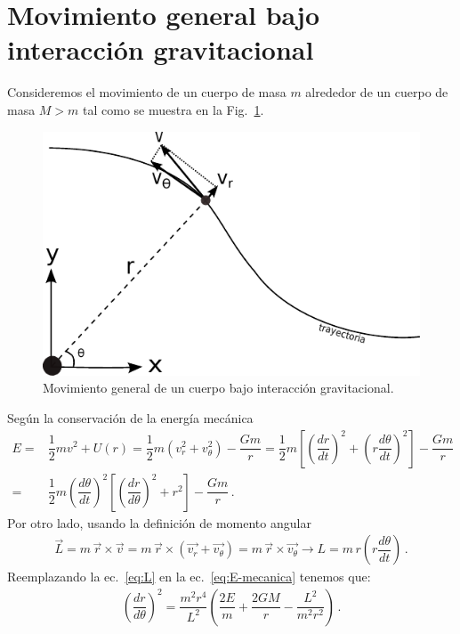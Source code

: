 \section{Movimiento general bajo interacción gravitacional}

Consideremos el movimiento de un cuerpo de masa $m$ alrededor de un cuerpo de masa $M>m$ tal como se muestra en la Fig.~\ref{fig:movimiento-general}.
\begin{figure}
\begin{center}
\includegraphics[scale=1]{gravitacion/g-movimiento-general}
\end{center}
\caption{Movimiento general de un cuerpo bajo interacción gravitacional.}
\label{fig:movimiento-general}
\end{figure}
Según la conservación de la energía mecánica
\begin{align}
\label{eq:E-mecanica}
E =& \dfrac{1}{2}mv^2 + U(r) = \dfrac{1}{2}m(v_r^2+v_\theta^2) -\dfrac{G m}{r} = \dfrac{1}{2}m\left[\left(\dfrac{dr}{dt}\right)^2+\left(r\dfrac{d\theta}{dt}\right)^2\right] -\dfrac{G m}{r} \nonumber \\
=& \dfrac{1}{2}m\left(\dfrac{d\theta}{dt}\right)^2 \left[\left(\dfrac{dr}{d\theta}\right)^2+r^2\right]-\dfrac{G m}{r}\,.
\end{align}
%
Por otro lado, usando la definición de momento angular
\begin{align}
\label{eq:L}
\vec{L}=m\,\vec{r}\times\vec{v}=m\,\vec{r}\times(\vec{v_r}+\vec{v_\theta})= m\,\vec{r}\times\vec{v_\theta} \to L = m\,r \left(r\dfrac{d\theta}{dt}\right)\,.
\end{align}
Reemplazando la ec.~\eqref{eq:L} en la ec.~\eqref{eq:E-mecanica} tenemos que:
\begin{align}
\label{eq:drdthetat}
\left(\dfrac{dr}{d\theta}\right)^2 = \dfrac{m^2r^4}{L^2}\left(\dfrac{2E}{m}+\dfrac{2GM}{r}-\dfrac{L^2}{m^2r^2}\right)\,.
\end{align}

